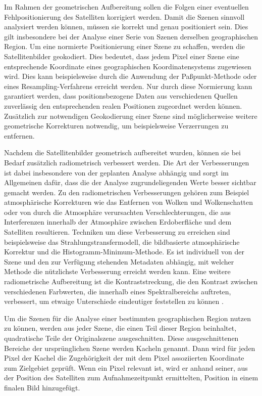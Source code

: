 Im Rahmen der geometrischen Aufbereitung sollen die Folgen einer eventuellen Fehlpositionierung des Satelliten korrigiert werden. Damit die Szenen sinnvoll analysiert werden können, müssen sie korrekt und genau positioniert sein. Dies gilt insbesondere bei der Analyse einer Serie von Szenen derselben geographischen Region. Um eine normierte Positionierung einer Szene zu schaffen, werden die Satellitenbilder geokodiert. Dies bedeutet, dass jedem Pixel einer Szene eine entsprechende Koordinate eines geographischen Koordinatensystems zugewiesen wird. Dies kann beispielsweise durch die Anwendung der Paßpunkt-Methode oder eines Resampling-Verfahrens erreicht werden. Nur durch diese Normierung kann garantiert werden, dass positionsbezogene Daten aus verschiedenen Quellen zuverlässig den entsprechenden realen Positionen zugeordnet werden können. Zusätzlich zur notwendigen Geokodierung einer Szene sind möglicherweise weitere geometrische Korrekturen notwendig, um beispielsweise Verzerrungen zu entfernen. 

Nachdem die Satellitenbilder geometrisch aufbereitet wurden, können sie bei Bedarf zusätzlich radiometrisch verbessert werden. Die Art der Verbesserungen ist dabei insbesondere von der geplanten Analyse abhängig und sorgt im Allgemeinen dafür, dass die der Analyse zugrundeliegenden Werte besser sichtbar gemacht werden. Zu den radiometrischen Verbesserungen gehören zum Beispiel atmosphärische Korrekturen wie das Entfernen von Wolken und Wolkenschatten oder von durch die Atmosphäre verursachten Verschlechterungen, die aus Interferenzen innerhalb der Atmosphäre zwischen Erdoberfläche und dem Satelliten resultieren. Techniken um diese Verbesserung zu erreichen sind beispielsweise das Strahlungstransfermodell, die bildbasierte atmosphärische Korrektur und die Histogramm-Minimum-Methode. Es ist individuell von der Szene und den zur Verfügung stehenden Metadaten abhängig, mit welcher Methode die nützlichste Verbesserung erreicht werden kann. 
Eine weitere radiometrische Aufbereitung ist die Kontraststreckung, die den Kontrast zwischen verschiedenen Farbwerten, die innerhalb eines Spektralbereichs auftreten, verbessert, um etwaige Unterschiede eindeutiger feststellen zu können \cite{Padge1997}.

Um die Szenen für die Analyse einer bestimmten geographischen Region nutzen zu können, werden aus jeder Szene, die einen Teil dieser Region beinhaltet, quadratische Teile der Originalszene ausgeschnitten. Diese ausgeschnittenen Bereiche der ursprünglichen Szene werden Kacheln genannt. Dann wird für jeden Pixel der Kachel die Zugehörigkeit der mit dem Pixel assoziierten Koordinate zum Zielgebiet geprüft. Wenn ein Pixel relevant ist, wird er anhand seiner, aus der Position des Satelliten zum Aufnahmezeitpunkt ermittelten, Position in einem finalen Bild hinzugefügt. 

